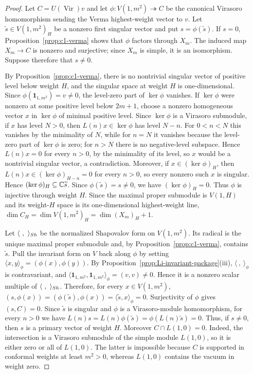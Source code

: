 \documentclass[10pt,a4paper]{amsart}
\numberwithin{equation}{section} \newtheorem{thm}{Theorem}[section] \newtheorem{lem}[thm]{Lemma} \newtheorem{ex}[thm]{Example} \newtheorem{prop}[thm]{Proposition} \newtheorem{cor}[thm]{Corollary} \newtheorem{defi}[thm]{Definition} \newtheorem{rmk}[thm]{Remark} \newtheorem{notation}[thm]{Notation}
\newcommand{\one}{\mathbf{1}}
\newcommand{\Vir}{\operatorname{Vir}}
\begin{document}
\begin{proof}
Let $C=U(\Vir)v$ and let \(\phi:V(1,m^2)\twoheadrightarrow C\) be the canonical Virasoro homomorphism sending the Verma highest-weight vector to $v$. Let $\widetilde s\in V(1,m^2)_H$ be a nonzero first singular vector and put $s=\phi(\widetilde s)$. If $s=0$, Proposition~\ref{prop:c1-verma} shows that $\phi$ factors through $X_m$. The induced map $X_m\to C$ is nonzero and surjective; since $X_m$ is simple, it is an isomorphism. Suppose therefore that $s\ne0$.

By Proposition~\ref{prop:c1-verma}, there is no nontrivial singular vector of positive level below weight $H$, and the singular space at weight $H$ is one-dimensional. Since $\phi(\one_{1,m^2})=v\ne0$, the level-zero part of $\ker\phi$ vanishes. If $\ker\phi$ were nonzero at some positive level below $2m+1$, choose a nonzero homogeneous vector $x$ in $\ker\phi$ of minimal positive level. Since $\ker\phi$ is a Virasoro submodule, if $x$ has level $N>0$, then $L(n)x\in\ker\phi$ has level $N-n$. For $0<n<N$ this vanishes by the minimality of $N$, while for $n=N$ it vanishes because the level-zero part of $\ker\phi$ is zero; for $n>N$ there is no negative-level subspace. Hence $L(n)x=0$ for every $n>0$, by the minimality of its level, so $x$ would be a nontrivial singular vector, a contradiction. Moreover, if $x\in(\ker\phi)_H$, then $L(n)x\in(\ker\phi)_{H-n}=0$ for every $n>0$, so every nonzero such $x$ is singular. Hence \((\ker\phi)_H\subseteq\mathbb{C}\widetilde s\). Since $\phi(\widetilde s)=s\ne0$, we have $(\ker\phi)_H=0$. Thus $\phi$ is injective through weight $H$. Since the maximal proper submodule is $V(1,H)$ and its weight-$H$ space is its one-dimensional highest-weight line, \(\dim C_H=\dim V(1,m^2)_H=\dim(X_m)_H+1.\)

Let $\langle\ ,\ \rangle_{\rm Sh}$ be the normalized Shapovalov form on $V(1,m^2)$. Its radical is the unique maximal proper submodule and, by Proposition~\ref{prop:c1-verma}, contains $\widetilde s$. Pull the invariant form on $V$ back along $\phi$ by setting \(\langle x,y\rangle_\phi=(\phi(x),\phi(y)).\) By Proposition~\ref{prop:Li-invariant-package}(iii), $\langle\ ,\ \rangle_\phi$ is contravariant, and \(\langle\one_{1,m^2},\one_{1,m^2}\rangle_\phi=(v,v)\ne0.\) Hence it is a nonzero scalar multiple of $\langle\ ,\ \rangle_{\rm Sh}$. Therefore, for every $x\in V(1,m^2)$, \((s,\phi(x))=(\phi(\widetilde s),\phi(x))=\langle\widetilde s,x\rangle_\phi=0.\) Surjectivity of $\phi$ gives $(s,C)=0$. Since $\widetilde s$ is singular and $\phi$ is a Virasoro-module homomorphism, for every $n>0$ we have $ L(n)s=L(n)\phi(\widetilde s) =\phi(L(n)\widetilde s)=0. $ Thus, if $s\ne0$, then $s$ is a primary vector of weight $H$. Moreover $C\cap L(1,0)=0$. Indeed, the intersection is a Virasoro submodule of the simple module $L(1,0)$, so it is either zero or all of $L(1,0)$. The latter is impossible because $C$ is supported in conformal weights at least $m^2>0$, whereas $L(1,0)$ contains the vacuum in weight zero.


\end{proof}
\end{document}
